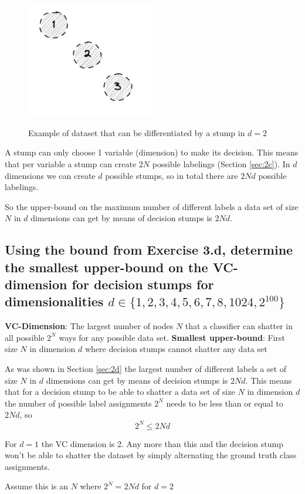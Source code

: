 \documentclass[11pt,a4paper]{article}
\begin{document}
\begin{figure}[h]
    \caption{Example of dataset that can be differentiated by a stump in $d=2$}
    \centering
    \includegraphics[width=0.5\textwidth]{shatter-stump.png}
    \label{fig:shatter-stump}
\end{figure}

A stump can only choose 1 variable (dimension) to make its decision. This means that per variable a stump can create $2N$ possible labelings (Section \ref{sec:2c}). In $d$ dimensions we can create $d$ possible stumps, so in total there are $2Nd$ possible labelings.

So the upper-bound on the maximum number of different labels a data set of size $N$ in $d$ dimensions can get by means of decision stumps is $2Nd$. 

\subsection{Using the bound from Exercise 3.d, determine the smallest upper-bound on the VC-dimension for decision stumps for dimensionalities $d ∈ \{1, 2, 3, 4, 5, 6, 7, 8, 1024, 2^{100}\}$}
\label{sec:3e}
\textbf{VC-Dimension}: The largest number of nodes $N$ that a classifier can shatter in all possible $2^N$ ways for any possible data set.
\textbf{Smallest upper-bound}: First size $N$ in dimension $d$ where decision stumps cannot shatter any data set

As was shown in Section \ref*{sec:2d} the largest number of different labels a set of size $N$ in $d$ dimensions can get by means of decision stumps is $2Nd$. This means that for a decision stump to be able to shatter a data set of size $N$ in dimension $d$ the number of possible label assignments $2^N$ needs to be less than or equal to $2Nd$, so $$2^N \leq 2Nd$$

For $d=1$ the VC dimension is 2. Any more than this and the decision stump won't be able to shatter the dataset by simply alternating the ground truth class assignments.

Assume this is an $N$ where $2^N = 2Nd$ 
for $d=2$ 
\end{document}
